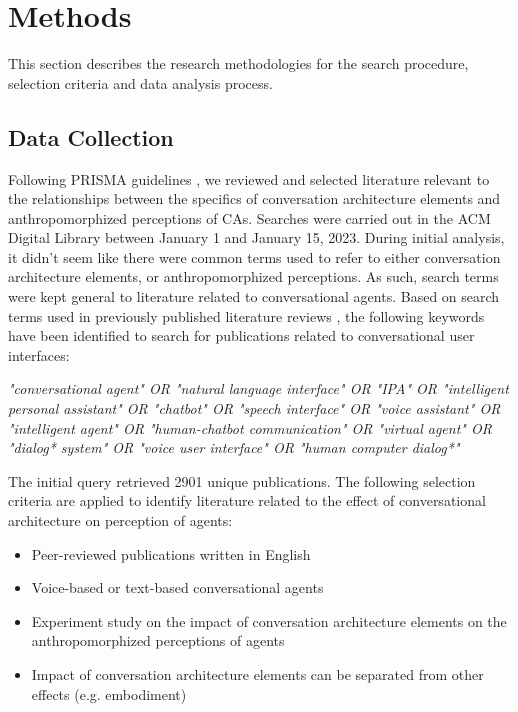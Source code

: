 \documentclass[sigconf,screen,review, anonymous]{acmart}
\begin{document}


\section{Methods}

This section describes the research methodologies for the search procedure, selection criteria and data analysis process.

\subsection{Data Collection}

Following PRISMA guidelines \cite{prisma}, we reviewed and selected literature relevant to the relationships between the specifics of conversation architecture elements and anthropomorphized perceptions of CAs. Searches were carried out in the ACM Digital Library between January 1 and January 15, 2023. During initial analysis, it didn't seem like there were common terms used to refer to either conversation architecture elements, or anthropomorphized perceptions. As such, search terms were kept general to literature related to conversational agents. Based on search terms used in previously published literature reviews \cite{clark2019state}\cite{rapp2021human} , the following keywords have been identified to search for publications related to conversational user interfaces:
\newline

\textit{"conversational agent" OR "natural language interface" OR "IPA" OR "intelligent personal assistant" OR "chatbot" OR "speech interface" OR "voice assistant" OR "intelligent agent" OR "human-chatbot communication" OR "virtual agent" OR "dialog* system" OR "voice user interface" OR "human computer dialog*"}
\newline

The initial query retrieved 2901 unique publications. The following selection criteria are applied to identify literature related to the effect of conversational architecture on perception of agents:
\begin{itemize}
  \item Peer-reviewed publications written in English
  \item Voice-based or text-based conversational agents
  \item Experiment study on the impact of conversation architecture elements on the anthropomorphized perceptions of agents
  \item Impact of conversation architecture elements can be separated from other effects (e.g. embodiment)

\end{itemize}
\end{document}
